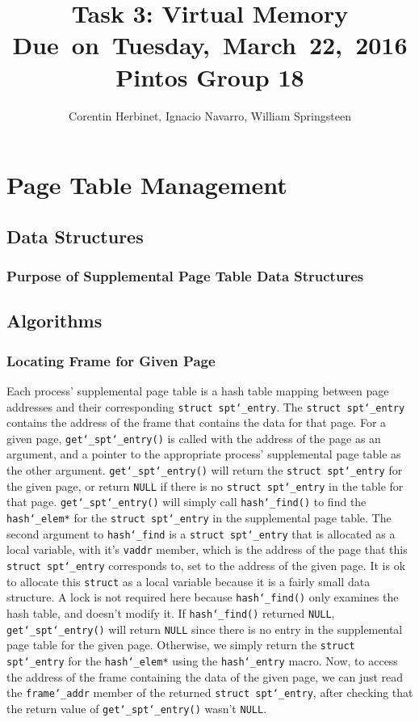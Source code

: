 \documentclass{article}
\title{
\vspace{2in}
\textmd{\textbf{Task 3: Virtual Memory}}\\
\normalsize\vspace{0.1in}\small{Due\ on\ Tuesday,\ March\ 22,\ 2016}\\
\vspace{0.1in}\large{\textbf{Pintos Group 18}}
\vspace{3in}
}
\author{Corentin Herbinet, Ignacio Navarro, William Springsteen}
\date{}
\renewcommand{\_}{\char`_}
\begin{document}
\maketitle
\newpage

\section{Page Table Management}

\subsection{Data Structures}

\subsubsection{Purpose of Supplemental Page Table Data Structures}

\subsection{Algorithms}

\subsubsection{Locating Frame for Given Page}

Each process' supplemental page table is a hash table mapping between page addresses and their corresponding \texttt{struct spt\_entry}. The \texttt{struct spt\_entry} contains the address of the frame that contains the data for that page. For a given page, \texttt{get\_spt\_entry()} is called with the address of the page as an argument, and a pointer to the appropriate process' supplemental page table as the other argument. \texttt{get\_spt\_entry()} will return the \texttt{struct spt\_entry} for the given page, or return \texttt{NULL} if there is no \texttt{struct spt\_entry} in the table for that page. \texttt{get\_spt\_entry()} will simply call \texttt{hash\_find()} to find the \texttt{hash\_elem*} for the \texttt{struct spt\_entry} in the supplemental page table. The second argument to \texttt{hash\_find} is a \texttt{struct spt\_entry} that is allocated as a local variable, with it's \texttt{vaddr} member, which is the address of the page that this \texttt{struct spt\_entry} corresponds to, set to the address of the given page. It is ok to allocate this \texttt{struct} as a local variable because it is a fairly small data structure. A lock is not required here because \texttt{hash\_find()} only examines the hash table, and doesn't modify it. If \texttt{hash\_find()} returned \texttt{NULL}, \texttt{get\_spt\_entry()} will return \texttt{NULL} since there is no entry in the supplemental page table for the given page. Otherwise, we simply return the \texttt{struct spt\_entry} for the \texttt{hash\_elem*} using the \texttt{hash\_entry} macro. Now, to access the address of the frame containing the data of the given page, we can just read the \texttt{frame\_addr} member of the returned \texttt{struct spt\_entry}, after checking that the return value of \texttt{get\_spt\_entry()} wasn't \texttt{NULL}.
\end{document}
